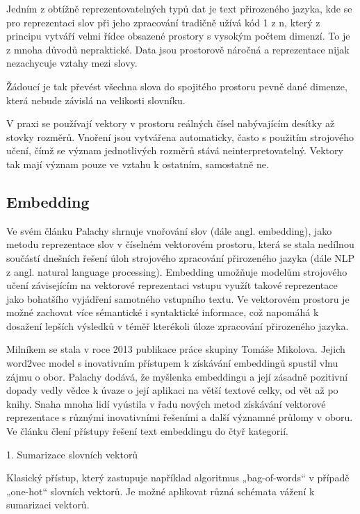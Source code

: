 \documentclass[thesis=M,czech]{FITthesis}[2019/12/23]
\begin{document}
Jedním z obtížně reprezentovatelných typů dat je text přirozeného jazyka, kde se pro reprezentaci slov při jeho zpracování tradičně užívá kód 1 z n, který z principu vytváří velmi řídce obsazené prostory s vysokým počtem dimenzí. To je z mnoha důvodů nepraktické. Data jsou prostorově náročná a reprezentace nijak nezachycuje vztahy mezi slovy.

Žádoucí je tak převést všechna slova do spojitého prostoru pevně dané dimenze, která nebude závislá na velikosti slovníku.

V praxi se používají vektory v prostoru reálných čísel nabývajícím desítky až stovky rozměrů. Vnoření jsou vytvářena automaticky, často s použitím strojového učení, čímž se význam jednotlivých rozměrů stává neinterpretovatelný. Vektory tak mají význam pouze ve vztahu k ostatním, samostatně ne.

\subsection{Embedding}
Ve svém článku Palachy\cite{palachy2019} shrnuje vnořování slov (dále angl. embedding), jako metodu reprezentace slov v číselném vektorovém prostoru, která se stala nedílnou součástí dnešních řešení úloh strojového zpracování přirozeného jazyka (dále NLP z angl. natural language processing). Embedding umožňuje modelům strojového učení závisejícím na vektorové reprezentaci vstupu využít takové reprezentace jako bohatšího vyjádření samotného vstupního textu. Ve vektorovém prostoru je možné zachovat více sémantické i syntaktické informace, což napomáhá k dosažení lepších výsledků v téměř kterékoli úloze zpracování přirozeného jazyka.

Milníkem se stala v roce 2013 publikace práce skupiny Tomáše Mikolova. Jejich word2vec model s inovativním přístupem k získávání embeddingů spustil vlnu zájmu o obor. 
Palachy dodává, že myšlenka embeddingu a její zásadně pozitivní dopady vedly vědce k úvaze o její aplikaci na větší textové celky, od vět až po knihy. Snaha mnoha lidí vyústila v řadu nových metod získávání vektorové reprezentace s různými inovativními řešeními a další významné průlomy v oboru.
Ve článku \cite{palachy2019} člení přístupy řešení text embeddingu do čtyř kategorií.

1.	Sumarizace slovních vektorů

Klasický přístup, který zastupuje například algoritmus „bag-of-words“ v případě „one-hot“ slovních vektorů. Je možné aplikovat různá schémata vážení k sumarizaci vektorů.
\end{document}
